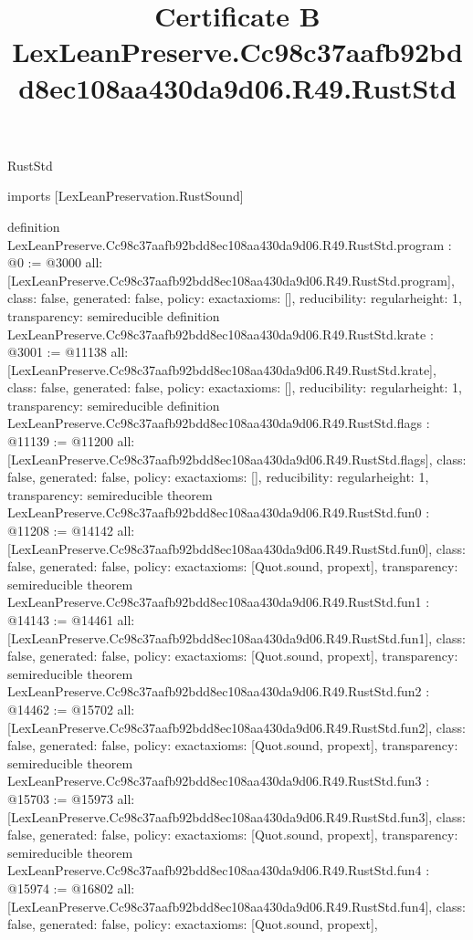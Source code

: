 \begin{lexlean}{RustStd}
\title{Certificate B LexLeanPreserve.Cc98c37aafb92bdd8ec108aa430da9d06.R49.RustStd}
\begin{coremodule}
imports [LexLeanPreservation.RustSound]

definition LexLeanPreserve.Cc98c37aafb92bdd8ec108aa430da9d06.R49.RustStd.program : @0 := @3000 {
  all: [LexLeanPreserve.Cc98c37aafb92bdd8ec108aa430da9d06.R49.RustStd.program],
  class: false,
  generated: false,
  policy: exact{axioms: []},
  reducibility: regular{height: 1},
  transparency: semireducible
}
definition LexLeanPreserve.Cc98c37aafb92bdd8ec108aa430da9d06.R49.RustStd.krate : @3001 := @11138 {
  all: [LexLeanPreserve.Cc98c37aafb92bdd8ec108aa430da9d06.R49.RustStd.krate],
  class: false,
  generated: false,
  policy: exact{axioms: []},
  reducibility: regular{height: 1},
  transparency: semireducible
}
definition LexLeanPreserve.Cc98c37aafb92bdd8ec108aa430da9d06.R49.RustStd.flags : @11139 := @11200 {
  all: [LexLeanPreserve.Cc98c37aafb92bdd8ec108aa430da9d06.R49.RustStd.flags],
  class: false,
  generated: false,
  policy: exact{axioms: []},
  reducibility: regular{height: 1},
  transparency: semireducible
}
theorem LexLeanPreserve.Cc98c37aafb92bdd8ec108aa430da9d06.R49.RustStd.fun0 : @11208 := @14142 {
  all: [LexLeanPreserve.Cc98c37aafb92bdd8ec108aa430da9d06.R49.RustStd.fun0],
  class: false,
  generated: false,
  policy: exact{axioms: [Quot.sound, propext]},
  transparency: semireducible
}
theorem LexLeanPreserve.Cc98c37aafb92bdd8ec108aa430da9d06.R49.RustStd.fun1 : @14143 := @14461 {
  all: [LexLeanPreserve.Cc98c37aafb92bdd8ec108aa430da9d06.R49.RustStd.fun1],
  class: false,
  generated: false,
  policy: exact{axioms: [Quot.sound, propext]},
  transparency: semireducible
}
theorem LexLeanPreserve.Cc98c37aafb92bdd8ec108aa430da9d06.R49.RustStd.fun2 : @14462 := @15702 {
  all: [LexLeanPreserve.Cc98c37aafb92bdd8ec108aa430da9d06.R49.RustStd.fun2],
  class: false,
  generated: false,
  policy: exact{axioms: [Quot.sound, propext]},
  transparency: semireducible
}
theorem LexLeanPreserve.Cc98c37aafb92bdd8ec108aa430da9d06.R49.RustStd.fun3 : @15703 := @15973 {
  all: [LexLeanPreserve.Cc98c37aafb92bdd8ec108aa430da9d06.R49.RustStd.fun3],
  class: false,
  generated: false,
  policy: exact{axioms: [Quot.sound, propext]},
  transparency: semireducible
}
theorem LexLeanPreserve.Cc98c37aafb92bdd8ec108aa430da9d06.R49.RustStd.fun4 : @15974 := @16802 {
  all: [LexLeanPreserve.Cc98c37aafb92bdd8ec108aa430da9d06.R49.RustStd.fun4],
  class: false,
  generated: false,
  policy: exact{axioms: [Quot.sound, propext]},
}
\end{coremodule}
\end{lexlean}

